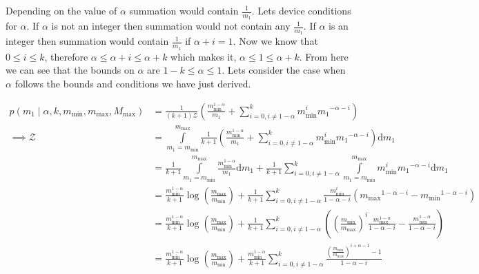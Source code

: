 \documentclass{article}
\newcommand{\mmin}{m_\text{min}}
\newcommand{\mmax}{m_\text{max}}
\newcommand{\Mmax}{M_\text{max}}
\newcommand{\Z}{\mathcal{Z}}
\newcommand{\diff}[1]{\mathrm{d}{#1}}
\begin{document}
Depending on the value of \(\alpha\) summation would contain \(\displaystyle\frac{1}{m_1}\). Lets device conditions for \(\alpha\). If \(\alpha\) is not an integer then summation would not contain any \(\displaystyle\frac{1}{m_1}\). If \(\alpha\) is an integer then summation would contain \(\displaystyle\frac{1}{m_1}\) if \(\alpha+i=1\). Now we know that \(0\le i\le k\), therefore \(\alpha\le \alpha+i\le \alpha+k\) which makes it, \(\alpha\le 1\le \alpha+k\). From here we can see that the bounds on \(\alpha\) are \(1-k\le \alpha\le 1\). Lets consider the case when \(\alpha\) follows the bounds and conditions we have just derived.

\begin{align}
    p(m_1\mid\alpha,k,\mmin,\mmax,\Mmax) & = \frac{1}{(k+1)\Z}\left(\frac{\mmin^{1-\alpha}}{m_1}+\sum\limits_{i=0,i\neq 1-\alpha}^{k}{\mmin^{i}{m_1}^{-\alpha-i}}\right)                                                                                                                      \\
    \implies \Z                          & = \int\limits_{m_1=\mmin}^{\mmax} \frac{1}{k+1}\left(\frac{\mmin^{1-\alpha}}{m_1}+\sum\limits_{i=0,i\neq 1-\alpha}^{k}{\mmin^{i}{m_1}^{-\alpha-i}}\right)\diff{m_1}                                                                                \\
                                         & = \frac{1}{k+1}\int\limits_{m_1=\mmin}^{\mmax}\frac{\mmin^{1-\alpha}}{m_1}\diff{m_1}+\frac{1}{k+1}\sum\limits_{i=0,i\neq 1-\alpha}^{k}\int\limits_{m_1=\mmin}^{\mmax}{\mmin^{i}{m_1}^{-\alpha-i}}\diff{m_1}                                        \\
                                         & = \frac{\mmin^{1-\alpha}}{k+1}\log{\left(\frac{\mmax}{\mmin}\right)}+\frac{1}{k+1}\sum\limits_{i=0,i\neq 1-\alpha}^{k}{\frac{\mmin^{i}}{1-\alpha-i}\left({\mmax}^{1-\alpha-i}-{\mmin}^{1-\alpha-i}\right)}                                         \\
                                         & = \frac{\mmin^{1-\alpha}}{k+1}\log{\left(\frac{\mmax}{\mmin}\right)}+\frac{1}{k+1}\sum\limits_{i=0,i\neq 1-\alpha}^{k}{\left({\left(\frac{\mmin}{\mmax}\right)}^{i}\frac{\mmax^{1-\alpha}}{1-\alpha-i}-\frac{\mmin^{1-\alpha}}{1-\alpha-i}\right)} \\
                                         & = \frac{\mmin^{1-\alpha}}{k+1}\log{\left(\frac{\mmax}{\mmin}\right)}+\frac{\mmin^{1-\alpha}}{k+1}\sum\limits_{i=0,i\neq 1-\alpha}^{k}\frac{\displaystyle{\left(\frac{\mmin}{\mmax}\right)}^{i+\alpha-1}-1}{1-\alpha-i}
\end{align}
\end{document}
